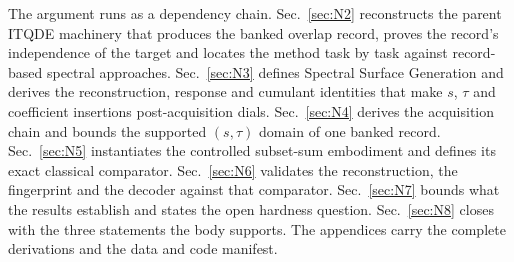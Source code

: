 The argument runs as a dependency chain. Sec.~\ref{sec:N2} reconstructs the parent ITQDE machinery that produces the banked overlap record, proves the record's independence of the target and locates the method task by task against record-based spectral approaches. Sec.~\ref{sec:N3} defines Spectral Surface Generation and derives the reconstruction, response and cumulant identities that make $s$, $\tau$ and coefficient insertions post-acquisition dials. Sec.~\ref{sec:N4} derives the acquisition chain and bounds the supported $(s, \tau)$ domain of one banked record. Sec.~\ref{sec:N5} instantiates the controlled subset-sum embodiment and defines its exact classical comparator. Sec.~\ref{sec:N6} validates the reconstruction, the fingerprint and the decoder against that comparator. Sec.~\ref{sec:N7} bounds what the results establish and states the open hardness question. Sec.~\ref{sec:N8} closes with the three statements the body supports. The appendices carry the complete derivations and the data and code manifest.
